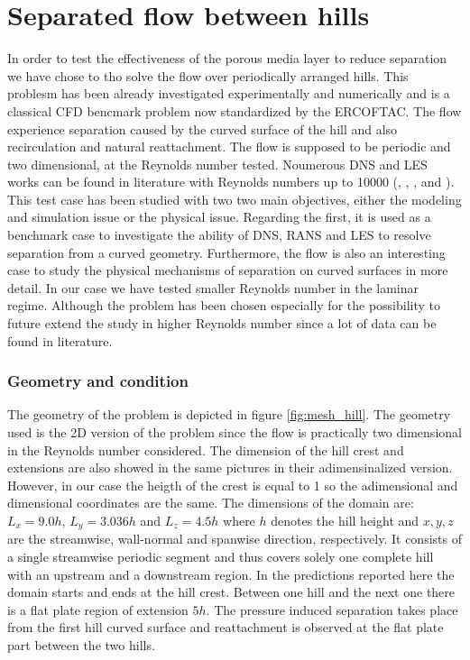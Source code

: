 \section{Separated flow between hills}
In order to test the effectiveness of the porous media layer to reduce separation we have chose to tho solve the flow over periodically arranged hills. This problesm  has been already investigated experimentally and numerically and is a classical CFD bencmark problem now standardized by the ERCOFTAC. 
The flow experience separation caused by the curved surface of the hill and also recirculation and natural reattachment. The flow is supposed to be periodic and two dimensional, at the Reynolds number tested. Noumerous DNS and LES works can be found in literature with Reynolds numbers up to 10000 (\citet{chang2014simulations}, \citet{breuer2005issues}, \citet{breuer2009flow}, \cite{almeida1993wake} and \cite{temmerman2001large}).
This test case has been studied with two two main objectives, either the modeling and simulation issue or the physical issue. Regarding the first, it is used as a benchmark case to investigate the ability of DNS, RANS and LES to resolve separation from a curved geometry. Furthermore, the flow is also an interesting case to study the physical mechanisms of separation on curved surfaces in more detail.
In our case we have tested smaller Reynolds number in the laminar regime. Although the problem has been chosen especially for the possibility to future extend the study in higher Reynolds number since a lot of data can be found in literature.

\subsubsection{Geometry and condition}
The geometry of the problem is depicted in figure \ref{fig:mesh_hill}. The geometry used is the 2D version of the problem since the flow is practically two dimensional in the Reynolds number considered. The dimension of the hill crest and extensions are also showed in the same pictures in their adimensinalized version. However, in our case the heigth of the crest is equal to 1 so the adimensional and dimensional coordinates are the same. The dimensions of the domain are: $L_x = 9.0 h$, $L_y = 3.036 h$ and $L_z = 4.5 h$ where $h$ denotes the hill height and $x,y,z$ are the streamwise, wall-normal and spanwise direction, respectively. It consists of a single streamwise periodic segment and thus covers solely one complete hill with an upstream and a downstream region. In the predictions reported here the domain starts and ends at the hill crest. 
Between one hill and the next one there is a flat plate region of extension $5h$. The pressure induced separation takes place from the first hill curved surface and reattachment is observed at the flat plate part between the two hills.



